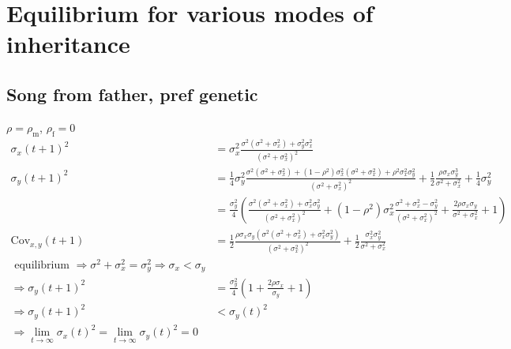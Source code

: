 \documentclass{article}
\newcommand{\x}[1]{\text{#1}}
\newcommand{\Cov}{\text{Cov}}
\begin{document}
\section{Equilibrium for various modes of inheritance }
\subsection{Song from father, pref genetic }
$\rho = \rho_\x{m}$, $\rho_\x{f}=0$
\begin{align*}
\sigma_{x}(t+1)^2&=\sigma_{x}^2\frac{\sigma^2(\sigma^2+\sigma_{x}^2)+\sigma_y^2\sigma_x^2}{(\sigma^2+\sigma_x^2)^2}
\\ \sigma_y(t+1)^2&=\frac{1}{4}\sigma_y^2\frac{\sigma^2(\sigma^2+\sigma_x^2)+(1-\rho^2)\sigma_x^2(\sigma^2+\sigma_x^2)+\rho^2\sigma_x^2\sigma_y^2}{(\sigma^2+\sigma_x^2)^2}+\frac{1}{2}\frac{\rho\sigma_x\sigma_y^3}{\sigma^2+\sigma_x^2}+\frac{1}{4}\sigma_y^2 
\\ &=\frac{\sigma_y^2}{4}\left(\frac{\sigma^2(\sigma^2+\sigma_x^2)+\sigma_x^2\sigma_y^2}{(\sigma^2+\sigma_x^2)^2}+(1-\rho^2)\sigma_x^2\frac{\sigma^2+\sigma_x^2-\sigma_y^2}{(\sigma^2+\sigma_x^2)^2}+\frac{2\rho\sigma_x\sigma_y}{\sigma^2+\sigma_x^2}+1\right)
\\ \Cov_{x,y}(t+1)&=\frac{1}{2}\frac{\rho\sigma_x\sigma_y\left(\sigma^2(\sigma^2+\sigma_x^2)+\sigma_x^2\sigma_y^2\right)}{(\sigma^2+\sigma_x^2)^2}+\frac{1}{2}\frac{\sigma_x^2\sigma_y^2}{\sigma^2+\sigma_x^2}
\\\text{ equilibrium } \Rightarrow \sigma^2+\sigma_x^2=\sigma_y^2 \Rightarrow \sigma_x<\sigma_y
\\ \Rightarrow \sigma_y(t+1)^2&=\frac{\sigma_y^2}{4}\left(1+\frac{2\rho\sigma_x}{\sigma_y}+1\right)
\\ \Rightarrow \sigma_y(t+1)^2&<\sigma_y(t)^2
\\ \Rightarrow \lim_{t\to\infty}\sigma_x(t)^2=\lim_{t\to\infty}\sigma_y(t)^2=0
\end{align*}
\end{document}

